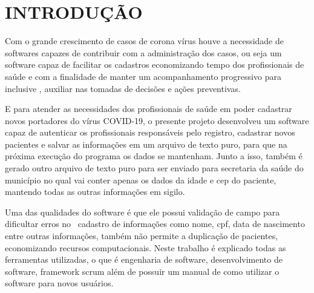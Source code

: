 \documentclass[
	12pt,				%
	oneside,			%
	a4paper,			%
  section=TITLE,
	brazil,				%
	]{abntex2}
\begin{document}
\tableofcontents*
\cleardoublepage
\textual


\pagestyle{simple}



\section{INTRODUÇÃO}
Com o grande crescimento de casos de corona vírus houve a necessidade de
softwares capazes de contribuir com a administração dos casos, ou seja um
software capaz de facilitar os cadastros economizando tempo dos profissionais
de saúde e com a finalidade de manter um acompanhamento progressivo para
inclusive , auxiliar nas tomadas de decisões e ações preventivas.

E para atender as necessidades dos profissionais de saúde em poder cadastrar
novos portadores do vírus COVID-19, o presente projeto desenvolveu um software
capaz de autenticar os profissionais responsáveis pelo registro, cadastrar
novos pacientes e salvar as informações em um arquivo de texto puro, para que
na próxima execução do programa os dados se mantenham. Junto a isso, também é
gerado outro arquivo de texto puro para ser enviado para secretaria da saúde do
município no qual vai conter apenas os dados da idade e cep do paciente,
mantendo todas as outras informações em sigilo. 

Uma das qualidades do software é que ele possui validação de campo para
dificultar erros no  cadastro de informações como nome, cpf, data de nascimento
entre outras informações, também não permite a duplicação de pacientes,
economizando recursos computacionais. Neste trabalho é explicado todas as
ferramentas utilizadas, o que é engenharia de software, desenvolvimento de
software, framework scrum além de possuir um manual de como utilizar o software
para novos usuários.


\end{document}
